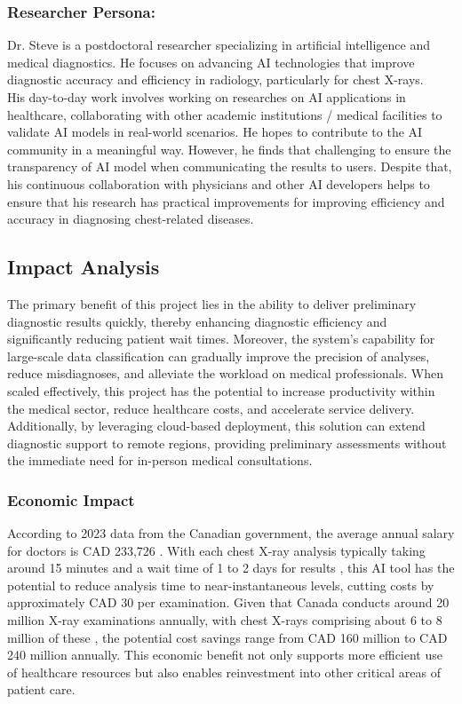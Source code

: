 \documentclass[12pt]{article}
\begin{document}
\subsubsection{Researcher Persona:}
Dr. Steve is a postdoctoral researcher specializing in artificial intelligence and medical diagnostics. He focuses on advancing AI technologies that improve diagnostic accuracy and efficiency in radiology, particularly for chest X-rays.\\
\newline
His day-to-day work involves working on researches on AI applications in healthcare, collaborating with other academic institutions / medical facilities  to validate AI models in real-world scenarios. He hopes to contribute to the AI community in a meaningful way. However, he finds that challenging to ensure the transparency of AI model when communicating the results to users. Despite that, his continuous collaboration with physicians and other AI developers helps to ensure that his research has practical improvements for improving efficiency and accuracy in diagnosing chest-related diseases.

\subsection{Impact Analysis}

The primary benefit of this project lies in the ability to deliver preliminary diagnostic results quickly, thereby enhancing diagnostic efficiency and significantly reducing patient wait times. Moreover, the system’s capability for large-scale data classification can gradually improve the precision of analyses, reduce misdiagnoses, and alleviate the workload on medical professionals. When scaled effectively, this project has the potential to increase productivity within the medical sector, reduce healthcare costs, and accelerate service delivery. Additionally, by leveraging cloud-based deployment, this solution can extend diagnostic support to remote regions, providing preliminary assessments without the immediate need for in-person medical consultations.

\subsubsection{Economic Impact}
According to 2023 data from the Canadian government, the average annual salary for doctors is CAD 233,726 \cite{2}. With each chest X-ray analysis typically taking around 15 minutes and a wait time of 1 to 2 days for results \cite{1}, this AI tool has the potential to reduce analysis time to near-instantaneous levels, cutting costs by approximately CAD 30 per examination. Given that Canada conducts around 20 million X-ray examinations annually, with chest X-rays comprising about 6 to 8 million of these \cite{3}, the potential cost savings range from CAD 160 million to CAD 240 million annually. This economic benefit not only supports more efficient use of healthcare resources but also enables reinvestment into other critical areas of patient care.
\end{document}
